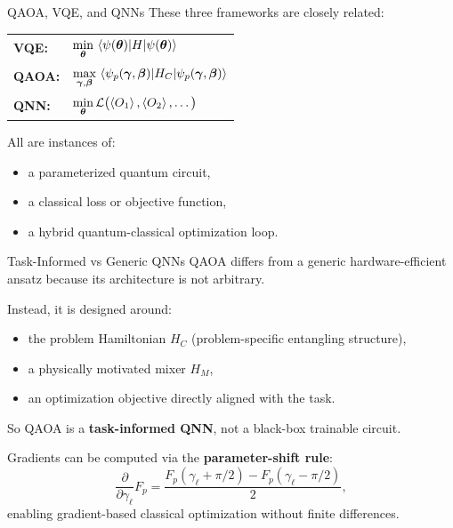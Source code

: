 \documentclass[aspectratio=169]{beamer}
\begin{document}
\begin{frame}{QAOA, VQE, and QNNs}
These three frameworks are closely related:

\medskip
\begin{center}
\begin{tabular}{ll}
\toprule
\textbf{VQE:}  & \(\displaystyle\min_{\bm{\theta}} \ev{H}{\psi(\bm{\theta})}\) \\[8pt]
\textbf{QAOA:} & \(\displaystyle\max_{\bm{\gamma},\bm{\beta}} \ev{H_C}{\psi_p(\bm{\gamma},\bm{\beta})}\) \\[8pt]
\textbf{QNN:}  & \(\displaystyle\min_{\bm{\theta}} \mathcal{L}\bigl(\ev{O_1},\ev{O_2},\dots\bigr)\) \\
\bottomrule
\end{tabular}
\end{center}

\medskip
All are instances of:
\begin{itemize}
    \item a parameterized quantum circuit,
    \item a classical loss or objective function,
    \item a hybrid quantum-classical optimization loop.
\end{itemize}
\end{frame}

\begin{frame}{Task-Informed vs Generic QNNs}
QAOA differs from a generic hardware-efficient ansatz because its architecture
is not arbitrary.

Instead, it is designed around:
\begin{itemize}
    \item the problem Hamiltonian \(H_C\) (problem-specific entangling structure),
    \item a physically motivated mixer \(H_M\),
    \item an optimization objective directly aligned with the task.
\end{itemize}

So QAOA is a \textbf{task-informed QNN}, not a black-box trainable circuit.

\medskip
Gradients can be computed via the \textbf{parameter-shift rule}:
\[
\frac{\partial}{\partial\gamma_\ell}F_p
=
\frac{F_p(\gamma_\ell+\pi/2)-F_p(\gamma_\ell-\pi/2)}{2},
\]
enabling gradient-based classical optimization without finite differences.
\end{frame}
\end{document}
